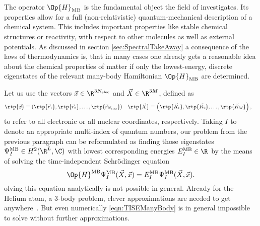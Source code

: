 The operator $\Op{H}_\text{MB}$ is the fundamental object
the field of  investigates.
Its properties allow for a full
(non-relativistic) quantum-mechanical description
of a chemical system.
This includes important properties like stable chemical structures
or reactivity, with respect to other molecules as well as external potentials.
As discussed in section \vref{sec:SpectralTakeAway}
a consequence of the laws of thermodynamics is,
that in many cases one already gets
a reasonable idea about the chemical properties of matter
if only the lowest-energy, discrete eigenstates of the relevant
many-body Hamiltonian $\Op{H}_\text{MB}$ are determined.

Let us use the vectors $\vec{x} \in \R^{3\Nelec}$ and $\vec{X} \in \R^{3M}$, defined as
\begin{align}
	\rtp{\vec{x}} &\equiv \left(\rtp{\vec{r}_1}, \rtp{\vec{r}_2}, \ldots, \rtp{\vec{r}_{\Nelec}}\right)
	&
	\rtp{\vec{X}} &\equiv \left(\rtp{\vec{R}_1}, \rtp{\vec{R}_2}, \ldots, \rtp{\vec{R}_{M}}\right),
	\label{eqn:DefAllCoords}
\end{align}
to refer to all electronic or all nuclear coordinates, respectively.
Taking $I$ to denote an appropriate multi-index of quantum numbers,
our problem from the previous paragraph can be reformulated
as finding those eigenstates $\Psi^\text{MB}_I \in H^2(\R^L, \C)$
with lowest corresponding energies $E^\text{MB}_I \in \R$
by the means of solving the time-independent Schrödinger equation
\begin{equation}
	\Op{H}^\text{MB} \Psi_I^\text{MB}(\vec{X}, \vec{x})
	= E_I^\text{MB} \Psi_I^\text{MB}(\vec{X}, \vec{x}).
	\label{eqn:TISEManyBody}
\end{equation}
olving this equation analytically is not possible in general.
Already for the Helium atom, a 3-body problem, clever approximations are needed
to get anywhere~\cite{Hylleras1929}.
But even numerically \eqref{eqn:TISEManyBody} is in general impossible to solve
without further approximations.


